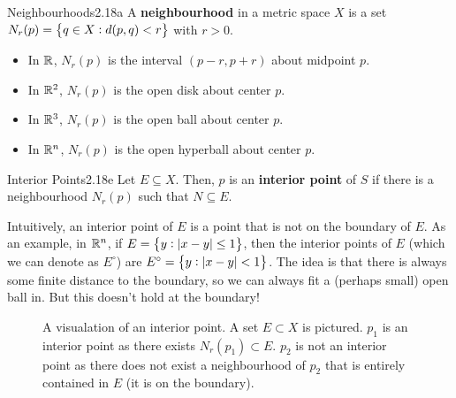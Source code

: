 \setcounter{rudin}{17}
\begin{definition}{Neighbourhoods}{2.18a}
    A \textbf{neighbourhood} in a metric space $X$ is a set $N_r(p) = \set{q \in X: d(p, q) < r}$ with $r > 0$. 
\end{definition}

\begin{nexample}{}
    \begin{itemize}
        \item In $\mathbb{R}$, $N_r(p)$ is the interval $(p - r, p + r)$ about midpoint $p$.
        \item In $\mathbb{R}^2$, $N_r(p)$ is the open disk about center $p$. 
        \item In $\mathbb{R}^3$, $N_r(p)$ is the open ball about center $p$.
        \item In $\mathbb{R}^n$, $N_r(p)$ is the open hyperball about center $p$. 
    \end{itemize}
\end{nexample}
\setcounter{rudin}{17}

\begin{definition}{Interior Points}{2.18e}
    Let $E \subseteq X$. Then, $p$ is an \textbf{interior point} of $S$ if there is a neighbourhood $N_r(p)$ such that $N \subseteq E$. 
\end{definition}
\noindent Intuitively, an interior point of $E$ is a point that is not on the boundary of $E$. As an example, in $\mathbb{R}^n$, if $E = \set{y: \abs{x - y} \leq 1}$, then the interior points of $E$ (which we can denote as $E^\circ$) are $E^\circ = \set{y: \abs{x - y} < 1}$. The idea is that there is always some finite distance to the boundary, so we can always fit a (perhaps small) open ball in. But this doesn't hold at the boundary!
\begin{figure}[htbp]
    \centering
    \caption{A visualation of an interior point. A set $E \subset X$ is pictured. $p_1$ is an interior point as there exists $N_r(p_1) \subset E$. $p_2$ is not an interior point as there does not exist a neighbourhood of $p_2$ that is entirely contained in $E$ (it is on the boundary). }
    \label{fig6}
\end{figure}

